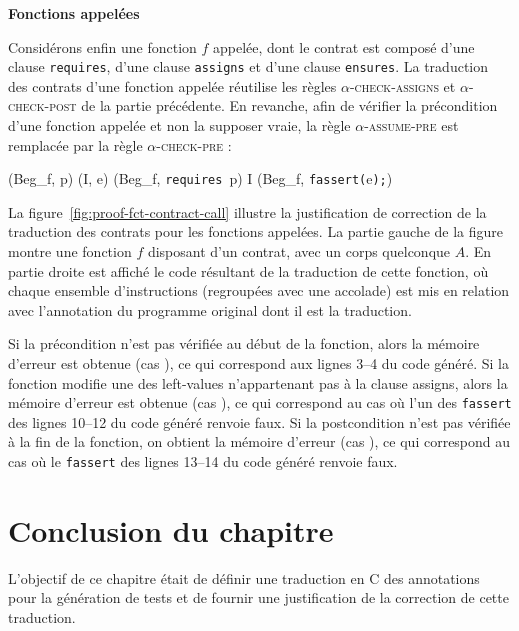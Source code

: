 \textbf{Fonctions appelées}



Considérons enfin une fonction $f$ appelée, dont le contrat est
composé d'une clause \lstinline'requires', d'une clause \lstinline'assigns' et
d'une clause \lstinline'ensures'.
La traduction des contrats d'une fonction appelée réutilise les règles
\textsc{$\alpha$-check-assigns} et \textsc{$\alpha$-check-post} de la partie
précédente.
En revanche, afin de vérifier la précondition d'une fonction appelée et non la
supposer vraie, la règle \textsc{$\alpha$-assume-pre} est remplacée par la règle
\textsc{$\alpha$-check-pre} :

{\scriptsize
  {
    {(Beg_f, p) \prule (I, e)}
    {(Beg_f, \mbox{\lstinline'requires'}~p\semicolon)
      \arule
      I \concat (Beg_f, \mbox{\lstinline'fassert('}e\mbox{\lstinline');'})
    }{}
  }
}

La figure~\ref{fig:proof-fct-contract-call} illustre la justification de
correction de la traduction des contrats pour les fonctions appelées.
La partie gauche de la figure montre une fonction $f$ disposant d'un
contrat, avec un corps quelconque $A$.
En partie droite est affiché le code résultant de la traduction de cette
fonction, où chaque ensemble d'instructions (regroupées avec une accolade) est
mis en relation avec l'annotation du programme original dont il est la
traduction.

Si la précondition n'est pas vérifiée au début de la fonction, alors
la mémoire d'erreur est obtenue (cas ), ce qui correspond aux
lignes 3--4 du code généré.
Si la fonction modifie une des left-values n'appartenant pas à la clause
assigns, alors la mémoire d'erreur est obtenue (cas ), ce qui
correspond au cas où l'un des \lstinline'fassert' des lignes 10--12 du code
généré renvoie faux.
Si la postcondition n'est pas vérifiée à la fin de la fonction, on obtient
la mémoire d'erreur (cas ), ce qui correspond au cas où le
\lstinline'fassert' des lignes 13--14 du code généré renvoie faux.


\section*{Conclusion du chapitre}

L'objectif de ce chapitre était de définir une traduction en C des annotations
\eacsl pour la génération de tests et de fournir une justification de la
correction de cette traduction.


